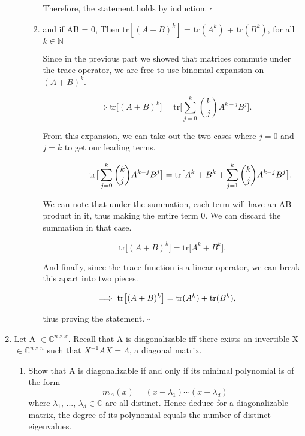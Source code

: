 \documentclass[12pt]{article}
\newcommand{\jump}{\vspace{5mm}}
\newcommand{\C}{\mathbb{C}}
\newcommand{\lm}{\lambda}
\begin{document}
\begin{enumerate}[leftmargin=\labelsep]
\begin{enumerate}
\begin{enumerate}
        Therefore, the statement holds by induction. $\square$

        \jump
        \item and if AB = 0, Then tr$[(A+B)^k]$ = tr$(A^k)$ + tr$(B^k)$, for all $k \in \mathbb{N}$

        \jump
        Since in the previous part we showed that matrices commute under the trace operator, we are free to use binomial expansion on $(A+B)^k$.

        \[
        \implies \text{tr}\big[ (A+B)^k\big] = \text{tr}\big[ \sum_{j = 0}^k {k \choose j} A^{k - j}B^j\big].
        \]

        From this expansion, we can take out the two cases where $j = 0$ and $j = k$ to get our leading terms.

        \[
        \hspace{15mm}\text{tr}\big[ \sum_{j = 0}^k {k \choose j} A^{k - j}B^j\big] = \text{tr}\big[ A^k + B^k + \sum_{j = 1}^k {k \choose j} A^{k - j}B^j\big].
        \]

        We can note that under the summation, each term will have an AB product in it, thus making the entire term 0. We can discard the summation in that case. 

        \[
        \text{tr}\big[ (A+B)^k\big] = \text{tr}\big[A^k + B^k\big].  
        \]

        And finally, since the trace function is a linear operator, we can break this apart into two pieces.

        \[
        \hspace{-5mm}\implies \text{tr}\big[ (A+B)^k\big] = \text{tr}(A^k) + \text{tr}(B^k), 
        \]

        thus proving the statement. $\square$
        
    \end{enumerate}

\end{enumerate}

\jump
\item Let A $\in \C^{n\times x}$. Recall that A is diagonalizable iff there exists an invertible X $\in \C^{n \times n}$ such that $X^{-1}AX = \Lambda$, a diagonal matrix.
\begin{enumerate}
    \item Show that A is diagonalizable if and only if its minimal polynomial is of the form 
    \[
    m_A(x) = (x - \lm_1)\cdots(x - \lm_d)
    \]
    where $\lm_1$, ..., $\lm_d \in \C$ are all distinct. Hence deduce for a diagonalizable matrix, the degree of its polynomial equals the number of distinct eigenvalues.

\end{enumerate}

\end{enumerate}
\end{document}

